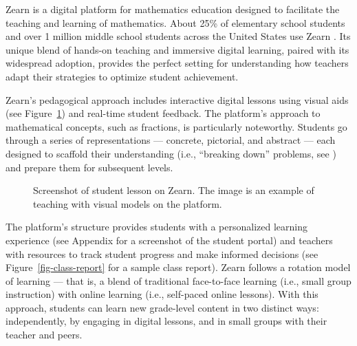 \documentclass[
  number,
  preprint,
  3p,
  onecolumn]{elsarticle}
\begin{document}
Zearn is a digital platform for mathematics education designed to
facilitate the teaching and learning of mathematics. About 25\% of
elementary school students and over 1 million middle school students
across the United States use Zearn \citep{zearn2024v}. Its unique blend
of hands-on teaching and immersive digital learning, paired with its
widespread adoption, provides the perfect setting for understanding how
teachers adapt their strategies to optimize student achievement.

Zearn's pedagogical approach includes interactive digital lessons using
visual aids (see Figure~\ref{fig-zearn-poster}) and real-time student
feedback. The platform's approach to mathematical concepts, such as
fractions, is particularly noteworthy. Students go through a series of
representations --- concrete, pictorial, and abstract --- each designed
to scaffold their understanding (i.e., ``breaking down'' problems, see
\citep{jumaat2014, reiser2014}) and prepare them for subsequent levels.

\begin{figure}


\caption{\label{fig-zearn-poster}Screenshot of student lesson on Zearn.
The image is an example of teaching with visual models on the platform.}

\end{figure}%

The platform's structure provides students with a personalized learning
experience (see Appendix for a screenshot of the student portal) and
teachers with resources to track student progress and make informed
decisions (see Figure~\ref{fig-class-report} for a sample class report).
Zearn follows a rotation model of learning --- that is, a blend of
traditional face-to-face learning (i.e., small group instruction) with
online learning (i.e., self-paced online lessons). With this approach,
students can learn new grade-level content in two distinct ways:
independently, by engaging in digital lessons, and in small groups with
their teacher and peers.
\end{document}
